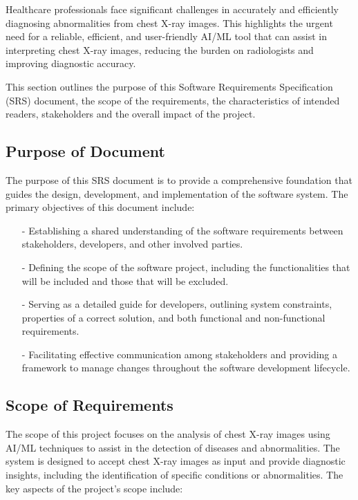 \documentclass[12pt]{article}
\begin{document}
\noindent Healthcare professionals face significant challenges in accurately and efficiently diagnosing abnormalities from chest X-ray images. This highlights the urgent need for a reliable, efficient, and user-friendly AI/ML tool that can assist in interpreting chest X-ray images, reducing the burden on radiologists and improving diagnostic accuracy.

\noindent This section outlines the purpose of this Software Requirements Specification (SRS) document, the scope of the requirements, the characteristics of intended readers, stakeholders and the overall impact of the project.

\subsection{Purpose of Document}

The purpose of this SRS document is to provide a comprehensive foundation that guides the design, development, and implementation of the software system. The primary objectives of this document include:

\begin{itemize}
    \item[-] Establishing a shared understanding of the software requirements between stakeholders, developers, and other involved parties.
    \item[-] Defining the scope of the software project, including the functionalities that will be included and those that will be excluded.
    \item[-] Serving as a detailed guide for developers, outlining system constraints, properties of a correct solution, and both functional and non-functional requirements.
    \item[-] Facilitating effective communication among stakeholders and providing a framework to manage changes throughout the software development lifecycle.
\end{itemize}

\subsection{Scope of Requirements}

The scope of this project focuses on the analysis of chest X-ray images using AI/ML techniques to assist in the detection of diseases and abnormalities. The system is designed to accept chest X-ray images as input and provide diagnostic insights, including the identification of specific conditions or abnormalities. The key aspects of the project's scope include:
\end{document}
